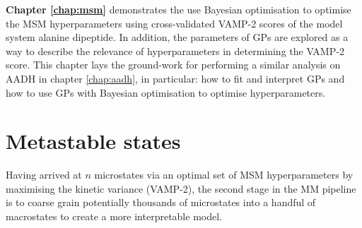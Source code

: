 \textbf{Chapter \ref{chap:msm}} demonstrates the use Bayesian optimisation to optimise the MSM hyperparameters using cross-validated VAMP-2 scores of the model system alanine dipeptide. In addition, the parameters of GPs are explored as a way to describe the relevance of hyperparameters in determining the VAMP-2 score. This chapter lays the ground-work for performing a similar analysis on AADH in chapter \ref{chap:aadh}, in particular: how to fit and interpret GPs and how to use GPs with Bayesian optimisation to optimise hyperparameters. 

\section{Metastable states}

Having arrived at $n$ microstates via an optimal set of MSM hyperparameters by maximising the kinetic variance (VAMP-2), the second  stage in the MM pipeline is to coarse grain potentially thousands of microstates into a handful of macrostates to create a more interpretable model. 
